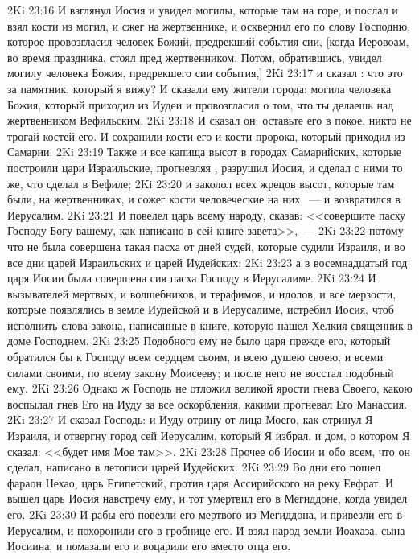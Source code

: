 \vs 2Ki 23:16 И взглянул Иосия и увидел могилы, которые  там на горе, и послал и взял кости из могил, и сжег на жертвеннике, и осквернил его по слову Господню, которое провозгласил человек Божий, предрекший события сии, [когда Иеровоам, во время праздника, стоял пред жертвенником. Потом, обратившись, увидел могилу человека Божия, предрекшего сии события,]
\vs 2Ki 23:17 и сказал : что это за памятник, который я вижу? И сказали ему жители города:  могила человека Божия, который приходил из Иудеи и провозгласил о том, что ты делаешь над жертвенником Вефильским.
\vs 2Ki 23:18 И сказал он: оставьте его в покое, никто не трогай костей его. И сохранили кости его и кости пророка, который приходил из Самарии.
\vs 2Ki 23:19 Также и все капища высот в городах Самарийских, которые построили цари Израильские, прогневляя , разрушил Иосия, и сделал с ними то же, что сделал в Вефиле;
\vs 2Ki 23:20 и заколол всех жрецов высот, которые там были, на жертвенниках, и сожег кости человеческие на них,~--- и возвратился в Иерусалим.
\vs 2Ki 23:21 И повелел царь всему народу, сказав: <<совершите пасху Господу Богу вашему, как написано в сей книге завета>>,~---
\vs 2Ki 23:22 потому что не была совершена такая пасха от дней судей, которые судили Израиля, и во все дни царей Израильских и царей Иудейских;
\vs 2Ki 23:23 а в восемнадцатый год царя Иосии была совершена сия пасха Господу в Иерусалиме.
\vs 2Ki 23:24 И вызывателей мертвых, и волшебников, и терафимов, и идолов, и все мерзости, которые появлялись в земле Иудейской и в Иерусалиме, истребил Иосия, чтоб исполнить слова закона, написанные в книге, которую нашел Хелкия священник в доме Господнем.
\vs 2Ki 23:25 Подобного ему не было царя прежде его, который обратился бы к Господу всем сердцем своим, и всею душею своею, и всеми силами своими, по всему закону Моисееву; и после него не восстал подобный ему.
\vs 2Ki 23:26 Однако ж Господь не отложил великой ярости гнева Своего, какою воспылал гнев Его на Иуду за все оскорбления, какими прогневал Его Манассия.
\vs 2Ki 23:27 И сказал Господь: и Иуду отрину от лица Моего, как отринул Я Израиля, и отвергну город сей Иерусалим, который Я избрал, и дом, о котором Я сказал: <<будет имя Мое там>>.
\rsbpar\vs 2Ki 23:28 Прочее об Иосии и обо всем, что он сделал, написано в летописи царей Иудейских.
\rsbpar\vs 2Ki 23:29 Во дни его пошел фараон Нехао, царь Египетский, против царя Ассирийского на реку Евфрат. И вышел царь Иосия навстречу ему, и тот умертвил его в Мегиддоне, когда увидел его.
\vs 2Ki 23:30 И рабы его повезли его мертвого из Мегиддона, и привезли его в Иерусалим, и похоронили его в гробнице его. И взял народ земли Иоахаза, сына Иосиина, и помазали его и воцарили его вместо отца его.
